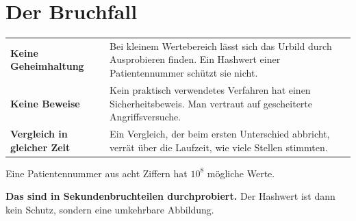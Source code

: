 \section{Der Bruchfall}

\begin{warnung}
\begin{center}
{\small
\renewcommand{\arraystretch}{1.52}
\begin{tabular}{@{}P{2.4cm}P{6.2cm}@{}}
\toprule
\textbf{Keine Geheimhaltung} & Bei kleinem Wertebereich lässt sich das Urbild durch Ausprobieren finden. Ein Hashwert einer Patientennummer schützt sie nicht.\\
\textbf{Keine Beweise} & Kein praktisch verwendetes Verfahren hat einen Sicherheitsbeweis. Man vertraut auf gescheiterte Angriffsversuche.\\
\textbf{Vergleich in gleicher Zeit} & Ein Vergleich, der beim ersten Unterschied abbricht, verrät über die Laufzeit, wie viele Stellen stimmten.\\
\bottomrule
\end{tabular}}
\end{center}

Eine Patientennummer aus acht Ziffern hat $10^{8}$ mögliche Werte.

\begin{center}
\begin{minipage}{0.9\textwidth}
\textbf{Das sind in Sekundenbruchteilen durchprobiert.} Der Hashwert ist dann kein Schutz, sondern eine umkehrbare Abbildung.
\end{minipage}
\end{center}

\begin{center}
\begin{minipage}{0.88\textwidth}
\end{minipage}
\end{center}

\begin{center}
\begin{minipage}{0.88\textwidth}
\end{minipage}
\end{center}
\end{warnung}

